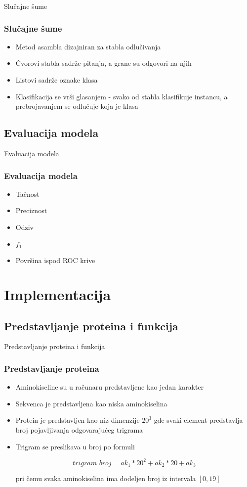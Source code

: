 \documentclass{beamer}
\begin{document}
 
 
\begin{frame}{Slučajne šume}
	\frametitle{Slučajne šume}
	
	\begin{itemize}
		\item Metod asambla dizajniran za stabla odlučivanja
		\item Čvorovi stabla sadrže pitanja, a grane su odgovori na njih
		\item Listovi sadrže oznake klasa
		\item Klasifikacija se vrši glasanjem - svako od stabla klasifikuje instancu, a prebrojavanjem se odlučuje koja je klasa
	\end{itemize}
\end{frame}



\subsection{Evaluacija modela}
\begin{frame}{Evaluacija modela}
	\frametitle{Evaluacija modela}
	\begin{itemize}
		\item Tačnost
		
		\item Preciznost
		
		\item Odziv
		
		\item $f_1$
		
		\item Površina ispod ROC krive
		
	\end{itemize}
\end{frame}
		
		
\section{Implementacija}
\subsection{Predstavljanje proteina i funkcija}
\begin{frame}{Predstavljanje proteina i funkcija}
	\frametitle{Predstavljanje proteina}
	\begin{itemize}
		\item Aminokiseline su u računaru predstavljene kao jedan karakter 
		\item Sekvenca je predstavljena kao niska aminokiselina
		\item Protein je predstavljen kao niz dimenzije $20^3$ gde svaki element predstavlja broj pojavljivanja odgovarajućeg trigrama
		\item Trigram se preslikava u broj po formuli 
		
		$$trigram\_broj = ak_1 * 20^2 + ak_2 * 20 + ak_3$$
		
		pri čemu svaka aminokiselina ima dodeljen broj iz intervala $[0, 19]$
	\end{itemize}
\end{frame}
\end{document}
